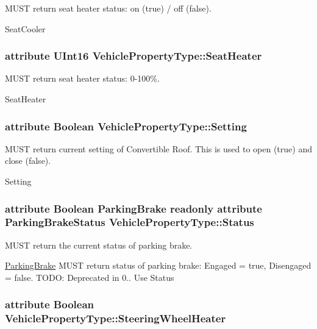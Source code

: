 M\+U\+S\+T return seat heater status\+: on (true) / off (false). 

Seat\+Cooler \hypertarget{interfaceVehiclePropertyType_a5dfb32720d0946f544bda753ea049276}{
\subsubsection[{Seat\+Heater}]{\setlength{\rightskip}{0pt plus 5cm}attribute U\+Int16 Vehicle\+Property\+Type\+::\+Seat\+Heater}}\label{interfaceVehiclePropertyType_a5dfb32720d0946f544bda753ea049276}


M\+U\+S\+T return seat heater status\+: 0-\/100\%. 

Seat\+Heater \hypertarget{interfaceVehiclePropertyType_ad09472a4b0e02adc79d0c4fe29131120}{
\subsubsection[{Setting}]{\setlength{\rightskip}{0pt plus 5cm}attribute Boolean Vehicle\+Property\+Type\+::\+Setting}}\label{interfaceVehiclePropertyType_ad09472a4b0e02adc79d0c4fe29131120}


M\+U\+S\+T return current setting of Convertible Roof. This is used to open (true) and close (false). 

Setting \hypertarget{interfaceVehiclePropertyType_adc169ce047115d43399d1ffa9dd1fb83}{
\subsubsection[{Status}]{\setlength{\rightskip}{0pt plus 5cm}attribute Boolean {\bf Parking\+Brake} {\bf readonly} attribute Parking\+Brake\+Status Vehicle\+Property\+Type\+::\+Status}}\label{interfaceVehiclePropertyType_adc169ce047115d43399d1ffa9dd1fb83}


M\+U\+S\+T return the current status of parking brake. 

\hyperlink{interfaceParkingBrake}{Parking\+Brake} M\+U\+S\+T return status of parking brake\+: Engaged = true, Disengaged = false. T\+O\+D\+O\+: Deprecated in 0.. Use Status \hypertarget{interfaceVehiclePropertyType_a8b1d53be28abbfc2bb58841cd4171237}{
\subsubsection[{Steering\+Wheel\+Heater}]{\setlength{\rightskip}{0pt plus 5cm}attribute Boolean Vehicle\+Property\+Type\+::\+Steering\+Wheel\+Heater}}\label{interfaceVehiclePropertyType_a8b1d53be28abbfc2bb58841cd4171237}


